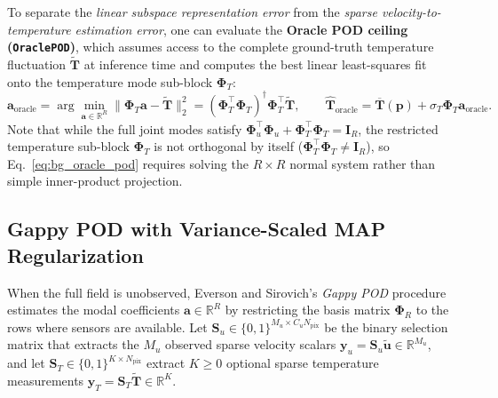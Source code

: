 To separate the \emph{linear subspace representation error} from the \emph{sparse velocity-to-temperature estimation error}, one can evaluate the \textbf{Oracle POD ceiling (\texttt{OraclePOD})}, which assumes access to the complete ground-truth temperature fluctuation $\tilde{\mathbf{T}}$ at inference time and computes the best linear least-squares fit onto the temperature mode sub-block $\boldsymbol{\Phi}_T$:
\begin{equation}
    \mathbf{a}_{\text{oracle}} = \arg\min_{\mathbf{a} \in \mathbb{R}^R} \|\boldsymbol{\Phi}_T \mathbf{a} - \tilde{\mathbf{T}}\|_2^2 = \left(\boldsymbol{\Phi}_T^\top \boldsymbol{\Phi}_T\right)^{\dagger} \boldsymbol{\Phi}_T^\top \tilde{\mathbf{T}}, \qquad \hat{\mathbf{T}}_{\text{oracle}} = \overline{\mathbf{T}}(\mathbf{p}) + \sigma_T \boldsymbol{\Phi}_T \mathbf{a}_{\text{oracle}}.
    \label{eq:bg_oracle_pod}
\end{equation}
Note that while the full joint modes satisfy $\boldsymbol{\Phi}_u^\top \boldsymbol{\Phi}_u + \boldsymbol{\Phi}_T^\top \boldsymbol{\Phi}_T = \mathbf{I}_R$, the restricted temperature sub-block $\boldsymbol{\Phi}_T$ is not orthogonal by itself ($\boldsymbol{\Phi}_T^\top \boldsymbol{\Phi}_T \neq \mathbf{I}_R$), so Eq.~\eqref{eq:bg_oracle_pod} requires solving the $R \times R$ normal system rather than simple inner-product projection.

\subsection{Gappy POD with Variance-Scaled MAP Regularization}
\label{subsec:bg_gappy_pod}

When the full field is unobserved, Everson and Sirovich's \emph{Gappy POD} procedure~\cite{everson1995karhunen, willcox2006unsteady} estimates the modal coefficients $\mathbf{a} \in \mathbb{R}^R$ by restricting the basis matrix $\boldsymbol{\Phi}_R$ to the rows where sensors are available. Let $\mathbf{S}_u \in \{0, 1\}^{M_u \times C_u N_{\text{pix}}}$ be the binary selection matrix that extracts the $M_u$ observed sparse velocity scalars $\mathbf{y}_u = \mathbf{S}_u \tilde{\mathbf{u}} \in \mathbb{R}^{M_u}$, and let $\mathbf{S}_T \in \{0, 1\}^{K \times N_{\text{pix}}}$ extract $K \ge 0$ optional sparse temperature measurements $\mathbf{y}_T = \mathbf{S}_T \tilde{\mathbf{T}} \in \mathbb{R}^K$.

